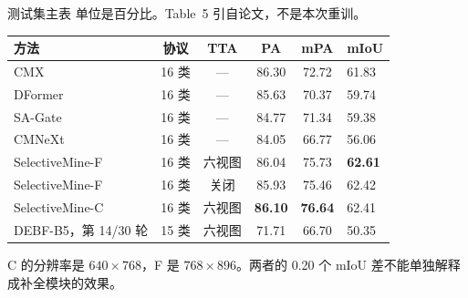 \documentclass[aspectratio=169,11pt]{ctexbeamer}
\begin{document}
\begin{frame}{测试集主表}
  \small
  单位是百分比。Table~5 引自论文，不是本次重训。
  \vspace{0.4em}
  \begin{tabular}{lcccc}
    \toprule
    方法 & 协议 & TTA & PA & mPA & mIoU \\
    \midrule
    CMX & 16 类 & --- & 86.30 & 72.72 & 61.83 \\
    DFormer & 16 类 & --- & 85.63 & 70.37 & 59.74 \\
    SA-Gate & 16 类 & --- & 84.77 & 71.34 & 59.38 \\
    CMNeXt & 16 类 & --- & 84.05 & 66.77 & 56.06 \\
    SelectiveMine-F & 16 类 & 六视图 & 86.04 & 75.73 & \textbf{62.61} \\
    SelectiveMine-F & 16 类 & 关闭 & 85.93 & 75.46 & 62.42 \\
    SelectiveMine-C & 16 类 & 六视图 & \textbf{86.10} & \textbf{76.64} & 62.41 \\
    DEBF-B5，第 14/30 轮 & 15 类 & 六视图 & 71.71 & 66.70 & 50.35 \\
    \bottomrule
  \end{tabular}

  \vspace{0.5em}
  \scriptsize C 的分辨率是 $640\times 768$，F 是 $768\times 896$。两者的 0.20 个 mIoU 差不能单独解释成补全模块的效果。
\end{frame}
\end{document}
